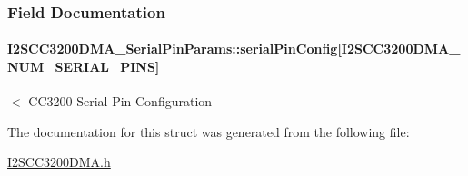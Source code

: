 \subsubsection{Field Documentation}
\paragraph[{serial\+Pin\+Config}]{ I2\+S\+C\+C3200\+D\+M\+A\+\_\+\+Serial\+Pin\+Params\+::serial\+Pin\+Config\mbox{[}{\bf I2\+S\+C\+C3200\+D\+M\+A\+\_\+\+N\+U\+M\+\_\+\+S\+E\+R\+I\+A\+L\+\_\+\+P\+I\+N\+S}\mbox{]}}\label{struct_i2_s_c_c3200_d_m_a___serial_pin_params_afba3cb7ac6b799fefacb4e64c7a91781}
$<$ C\+C3200 Serial Pin Configuration 

The documentation for this struct was generated from the following file\+:\begin{DoxyCompactItemize}
\item 
\hyperlink{_i2_s_c_c3200_d_m_a_8h}{I2\+S\+C\+C3200\+D\+M\+A.\+h}\end{DoxyCompactItemize}
